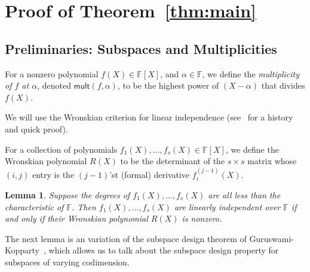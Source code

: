 \documentclass{article}
\newtheorem{lemma}[theorem]{Lemma}
\newcommand{\F}{\mathbb{F}}
\newcommand{\mult}{\mathsf{mult}}
\begin{document}
\section{Proof of Theorem~\ref{thm:main}}

\subsection{Preliminaries: Subspaces and Multiplicities}

For a nonzero polynomial $f(X) \in \F[X]$, and $\alpha \in \F$, we define the {\em multiplicity of $f$ at $\alpha$}, denoted $\mult(f, \alpha)$, to be the highest power of $(X-\alpha)$ that divides $f(X)$.

We will use the Wronskian criterion for linear independence (see~\cite{BD10} for a history and quick proof).

For a collection of polynomials $f_1(X), \ldots, f_s(X) \in \F[X]$, we define the Wronskian polynomial $R(X)$ to be the determinant of the $s \times s$ matrix whose $(i,j)$ entry is
the $(j-1)$'st (formal) derivative $f_i^{(j-1)}(X)$.

\begin{lemma}\label{lem:W}
Suppose the degrees of $f_1(X), \ldots, f_s(X)$ are all less than the characteristic of $\F$.
Then $f_1(X), \ldots, f_s(X)$ are linearly independent over $\F$ if and only if their Wronskian polynomial $R(X)$ is nonzero.
\end{lemma}

The next lemma is an variation of the subspace design theorem of Guruswami-Kopparty~\cite{GK16}, which allows us to talk about the subspace design property for subspaces of varying codimension.
\end{document}
